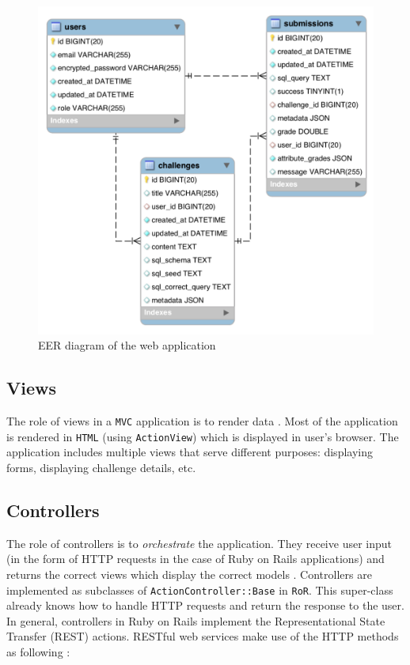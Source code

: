 \begin{figure}[h]
    \centering
    \includegraphics[width=\textwidth/3*2]{Chapters/4-Design/database_schema.png}
    \caption{EER diagram of the web application}
\end{figure}

\subsection{Views}

The role of views in a \texttt{MVC} application is to render data \citep{ruby_on_rails}. Most of the application is rendered in \texttt{HTML} (using \texttt{ActionView}) which is displayed in user's browser. The application includes multiple views that serve different purposes: displaying forms, displaying challenge details, etc.

\subsection{Controllers}

The role of controllers is to \textit{orchestrate} the application. They receive user input (in the form of HTTP requests in the case of Ruby on Rails applications) and returns the correct views which display the correct models \citep{ruby_on_rails_book}. Controllers are implemented as subclasses of \texttt{ActionController::Base} in \texttt{RoR}. This super-class already knows how to handle HTTP requests and return the response to the user. In general, controllers in Ruby on Rails implement the Representational State Transfer (REST) actions. RESTful web services make use of the HTTP methods as following \citep{rodriguez2008restful}:

